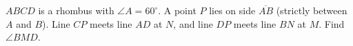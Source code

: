 $ABCD$ is a rhombus with $\angle A=60^\circ$. A point $P$ lies on side $\overline{AB}$ (strictly between $A$ and $B$). Line $CP$ meets line $AD$ at $N$, and line $DP$ meets line $BN$ at $M$. Find $\angle BMD$.
